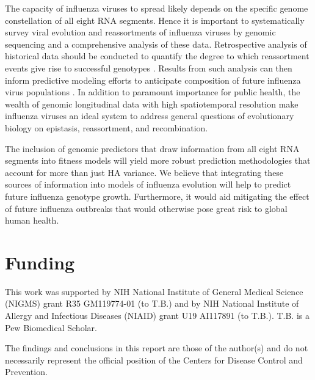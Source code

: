 The capacity of influenza viruses to spread likely depends on the specific genome constellation of all eight RNA segments.
Hence it is important to systematically survey viral evolution and reassortments of influenza viruses by genomic sequencing and a comprehensive analysis of these data.
Retrospective analysis of historical data should be conducted to quantify the degree to which reassortment events give rise to successful genotypes \citep{nelson_multiple_2008, dudas_reassortment_2015, villa_fitness_2017}.
Results from such analysis can then inform predictive modeling efforts to anticipate composition of future influenza virus populations \citep{luksza_predictive_2014, neher_predicting_2014, morris_predictive_2017, klingen_silico_2018}.
In addition to paramount importance for public health, the wealth of genomic longitudinal data with high spatiotemporal resolution make influenza viruses an ideal system to address general questions of evolutionary biology on epistasis, reassortment, and recombination.

The inclusion of genomic predictors that draw information from all eight RNA segments into fitness models will yield more robust prediction methodologies that account for more than just HA variance.
We believe that integrating these sources of information into models of influenza evolution will help to predict future influenza genotype growth.
Furthermore, it would aid mitigating the effect of future influenza outbreaks that would otherwise pose great risk to global human health.

\section*{Funding}
This work was supported by NIH National Institute of General Medical Science (NIGMS) grant R35 GM119774-01 (to T.B.) and by NIH National Institute of Allergy and Infectious Diseases (NIAID) grant U19 AI117891 (to T.B.). T.B. is a Pew Biomedical Scholar.

The findings and conclusions in this report are those of the author(s) and do not necessarily represent the official position of the Centers for Disease Control and Prevention.
